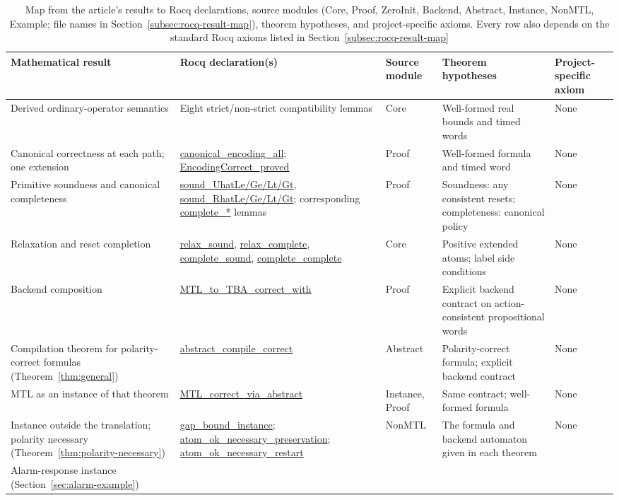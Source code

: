 \documentclass[manuscript]{acmart}
\newcommand{\Rocqid}[1]{\url{#1}}
\begin{document}
\begin{table}[t]
\centering
\caption{Map from the article's results to Rocq declarations, source modules
(Core, Proof, ZeroInit, Backend, Abstract, Instance, NonMTL, Example; file
names in
Section~\ref{subsec:rocq-result-map}),
theorem hypotheses, and project-specific axioms. Every row also depends on the
standard Rocq axioms listed in Section~\ref{subsec:rocq-result-map}}
\label{tab:rocq-result-map}
\footnotesize
\begin{tabular}{@{}p{}p{}p{}p{}p{}@{}}
\toprule
Mathematical result & Rocq declaration(s) & Source module & Theorem hypotheses & Project-specific axiom\\
\midrule
Derived ordinary-operator semantics &
Eight strict/non-strict compatibility lemmas &
Core &
Well-formed real bounds and timed words &
None\\
Canonical correctness at each path; one extension &
\Rocqid{canonical_encoding_all};
\Rocqid{EncodingCorrect_proved} &
Proof &
Well-formed formula and timed word &
None\\
Primitive soundness and canonical completeness &
\Rocqid{sound_UhatLe/Ge/Lt/Gt},
\Rocqid{sound_RhatLe/Ge/Lt/Gt};
corresponding \Rocqid{complete_*} lemmas &
Proof &
Soundness: any consistent resets; completeness: canonical policy &
None\\
Relaxation and reset completion &
\Rocqid{relax_sound}, \Rocqid{relax_complete},
\Rocqid{complete_sound}, \Rocqid{complete_complete} &
Core &
Positive extended atoms; label side conditions &
None\\
Backend composition &
\Rocqid{MTL_to_TBA_correct_with} &
Proof &
Explicit backend contract on action-consistent propositional words &
None\\
Compilation theorem for polarity-correct formulas
(Theorem~\ref{thm:general}) &
\Rocqid{abstract_compile_correct} &
Abstract &
Polarity-correct formula; explicit backend contract &
None\\
MTL as an instance of that theorem &
\Rocqid{MTL_correct_via_abstract} &
Instance, Proof &
Same contract; well-formed formula &
None\\
Instance outside the translation; polarity necessary
(Theorem~\ref{thm:polarity-necessary}) &
\Rocqid{gap_bound_instance};
\Rocqid{atom_ok_necessary_preservation};
\Rocqid{atom_ok_necessary_restart} &
NonMTL &
The formula and backend automaton given in each theorem &
None\\
Alarm-response instance (Section~\ref{sec:alarm-example}) &

\end{tabular}
\end{table}
\end{document}

